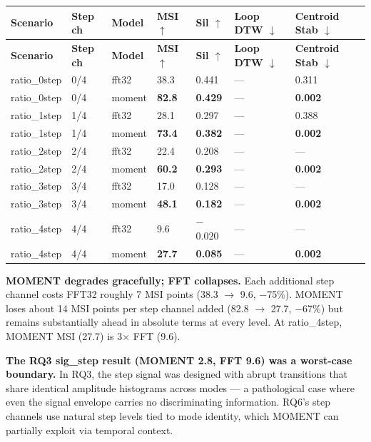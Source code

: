 \documentclass[11pt,a4paper]{article}
\begin{document}
\begin{longtable}{|l|l|l|l|l|l|l|}
\hline
\textbf{Scenario} & \textbf{Step ch} & \textbf{Model} & \textbf{MSI $\uparrow$} & \textbf{Sil $\uparrow$} & \textbf{Loop DTW $\downarrow$} & \textbf{Centroid Stab $\downarrow$} \\
\hline
\endfirsthead
\hline
\textbf{Scenario} & \textbf{Step ch} & \textbf{Model} & \textbf{MSI $\uparrow$} & \textbf{Sil $\uparrow$} & \textbf{Loop DTW $\downarrow$} & \textbf{Centroid Stab $\downarrow$} \\
\hline
\endhead
\hline
\endfoot
ratio\_0step & 0/4 & fft32 & 38.3 & 0.441 & --- & 0.311 \\
\hline
ratio\_0step & 0/4 & moment & \textbf{82.8} & \textbf{0.429} & --- & \textbf{0.002} \\
\hline
ratio\_1step & 1/4 & fft32 & 28.1 & 0.297 & --- & 0.388 \\
\hline
ratio\_1step & 1/4 & moment & \textbf{73.4} & \textbf{0.382} & --- & \textbf{0.002} \\
\hline
ratio\_2step & 2/4 & fft32 & 22.4 & 0.208 & --- & --- \\
\hline
ratio\_2step & 2/4 & moment & \textbf{60.2} & \textbf{0.293} & --- & \textbf{0.002} \\
\hline
ratio\_3step & 3/4 & fft32 & 17.0 & 0.128 & --- & --- \\
\hline
ratio\_3step & 3/4 & moment & \textbf{48.1} & \textbf{0.182} & --- & \textbf{0.002} \\
\hline
ratio\_4step & 4/4 & fft32 & 9.6 & $-$0.020 & --- & --- \\
\hline
ratio\_4step & 4/4 & moment & \textbf{27.7} & \textbf{0.085} & --- & \textbf{0.002} \\
\hline
\end{longtable}

\textbf{MOMENT degrades gracefully; FFT collapses.} Each additional step channel costs FFT32
roughly 7 MSI points (38.3 $\rightarrow$ 9.6, $-$75\%). MOMENT loses about 14 MSI points per step channel
added (82.8 $\rightarrow$ 27.7, $-$67\%) but remains substantially ahead in absolute terms at every level.
At ratio\_4step, MOMENT MSI (27.7) is 3× FFT (9.6).

\textbf{The RQ3 sig\_step result (MOMENT 2.8, FFT 9.6) was a worst-case boundary.} In RQ3, the step
signal was designed with abrupt transitions that share identical amplitude histograms across modes
--- a pathological case where even the signal envelope carries no discriminating information. RQ6's
step channels use natural step levels tied to mode identity, which MOMENT can partially exploit via
temporal context.
\end{document}
